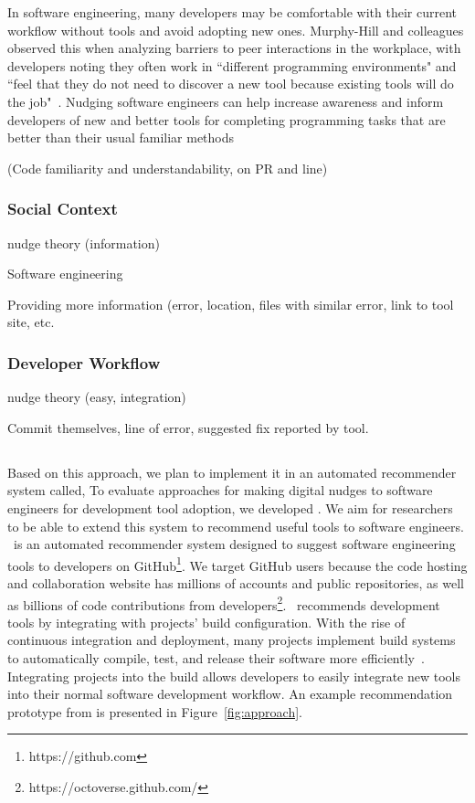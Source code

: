 In software engineering, many developers may be comfortable with their current workflow without tools and avoid adopting new ones. Murphy-Hill and colleagues observed this when analyzing barriers to peer interactions in the workplace, with developers noting they often work in ``different programming environments" and ``feel that they do not need to discover a new tool because existing tools will do the job"~\cite[p.~76-77]{Murphy-Hill2015HowDoUsers}. Nudging software engineers can help increase awareness and inform developers of new and better tools for completing programming tasks that are better than their usual familiar methods

\process (Code familiarity and understandability, on PR and line)

\subsubsection{Social Context}

nudge theory (information)

Software engineering

Providing more information (error, location, files with similar error, link to tool site, etc.

\subsubsection{Developer Workflow}

nudge theory (easy, integration)

Commit themselves, line of error, suggested fix reported by tool.

\subsection{\TOOL}

Based on this approach, we plan to implement it in an automated recommender system called, To evaluate approaches for making digital nudges to software engineers for development tool adoption, we developed \TOOL. We aim for researchers to be able to extend this system to recommend useful tools to software engineers. \TOOL~is an automated recommender system designed to suggest software engineering tools to developers on GitHub\footnote{https://github.com}. We target GitHub users because the code hosting and collaboration website has millions of accounts and public repositories, as well as billions of code contributions from developers\footnote{https://octoverse.github.com/}. \TOOL~recommends development tools by integrating with projects' build configuration. With the rise of continuous integration and deployment, many projects implement build systems to automatically compile, test, and release their software more efficiently~\cite{AkondDeployment}. Integrating projects into the build allows developers to easily integrate new tools into their normal software development workflow. An example recommendation prototype from \TOOL is presented in Figure~\ref{fig:approach}.


